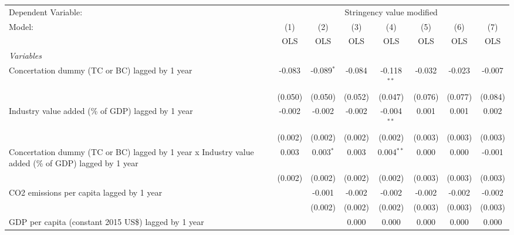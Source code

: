 
\begingroup
\centering
\begin{tabular}{lccccccc}
   \toprule
   Dependent Variable: & \multicolumn{7}{c}{Stringency value modified}\\
   Model:                                                                                              & (1)     & (2)          & (3)     & (4)           & (5)     & (6)     & (7)\\  
                                                                                                       &  OLS    & OLS          & OLS     & OLS           & OLS     & OLS     & OLS\\  
   \midrule
   \emph{Variables}\\
   Concertation dummy (TC or BC) lagged by 1 year                                                      & -0.083  & -0.089$^{*}$ & -0.084  & -0.118$^{**}$ & -0.032  & -0.023  & -0.007\\   
                                                                                                       & (0.050) & (0.050)      & (0.052) & (0.047)       & (0.076) & (0.077) & (0.084)\\   
   Industry value added (\% of GDP) lagged by 1 year                                                   & -0.002  & -0.002       & -0.002  & -0.004$^{**}$ & 0.001   & 0.001   & 0.002\\   
                                                                                                       & (0.002) & (0.002)      & (0.002) & (0.002)       & (0.003) & (0.003) & (0.003)\\   
   Concertation dummy (TC or BC) lagged by 1 year x Industry value added (\% of GDP) lagged by 1 year  & 0.003   & 0.003$^{*}$  & 0.003   & 0.004$^{**}$  & 0.000   & 0.000   & -0.001\\   
                                                                                                       & (0.002) & (0.002)      & (0.002) & (0.002)       & (0.003) & (0.003) & (0.003)\\   
   CO2 emissions per capita lagged by 1 year                                                           &         & -0.001       & -0.002  & -0.002        & -0.002  & -0.002  & -0.002\\   
                                                                                                       &         & (0.002)      & (0.002) & (0.002)       & (0.003) & (0.003) & (0.003)\\   
   GDP per capita (constant 2015 US\$) lagged by 1 year                                                &         &              & 0.000   & 0.000         & 0.000   & 0.000   & 0.000\\   

\end{tabular}
